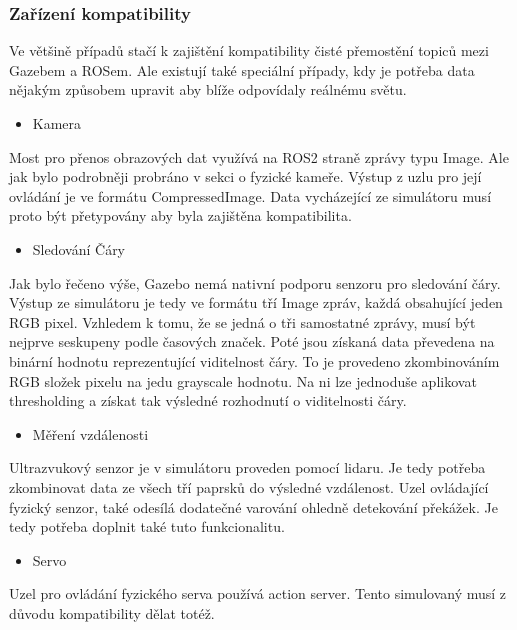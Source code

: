 \subsubsection*{Zařízení kompatibility}
Ve většině případů stačí k zajištění kompatibility čisté přemostění topiců mezi Gazebem a ROSem. Ale existují také speciální případy, kdy je potřeba data nějakým způsobem upravit aby blíže odpovídaly reálnému světu. 

\begin{itemize}[leftmargin=*]
	\item{Kamera}
\end{itemize}
\vspace*{-0.5em}
Most pro přenos obrazových dat využívá na ROS2 straně zprávy typu Image. Ale jak bylo podrobněji probráno v sekci o fyzické kameře. Výstup z uzlu pro její ovládání je ve formátu CompressedImage. Data vycházející ze simulátoru musí proto být přetypovány aby byla zajištěna kompatibilita.

\begin{itemize}[leftmargin=*]
	\item{Sledování Čáry}
\end{itemize}
\vspace*{-0.5em}
Jak bylo řečeno výše, Gazebo nemá nativní podporu senzoru pro sledování čáry. Výstup ze simulátoru je tedy ve formátu tří Image zpráv, každá obsahující jeden RGB pixel. Vzhledem k tomu, že se jedná o tři samostatné zprávy, musí být nejprve seskupeny podle časových značek. Poté jsou získaná data převedena na binární hodnotu reprezentující viditelnost čáry. To je provedeno zkombinováním RGB složek pixelu na jedu grayscale hodnotu. Na ni lze jednoduše aplikovat thresholding a získat tak výsledné rozhodnutí o viditelnosti čáry.

\begin{itemize}[leftmargin=*]
	\item{Měření vzdálenosti}
\end{itemize}
\vspace*{-0.5em}
Ultrazvukový senzor je v simulátoru proveden pomocí lidaru. Je tedy potřeba zkombinovat data ze všech tří paprsků do výsledné vzdálenost. Uzel ovládající fyzický senzor, také odesílá dodatečné varování ohledně detekování překážek. Je tedy potřeba doplnit také tuto funkcionalitu.

\begin{itemize}[leftmargin=*]
	\item{Servo}
\end{itemize}
\vspace*{-0.5em}
Uzel pro ovládání fyzického serva používá action server. Tento simulovaný musí z důvodu kompatibility dělat totéž.

